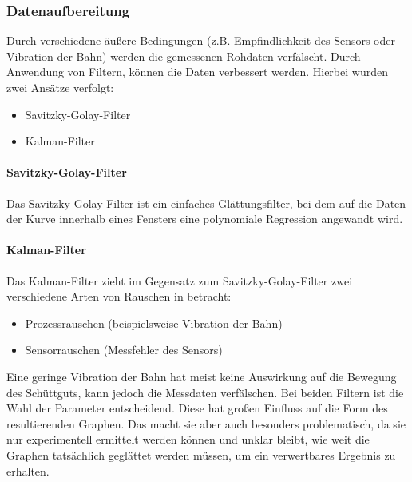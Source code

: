 \subsubsection{Datenaufbereitung}
Durch verschiedene äußere Bedingungen (z.B. Empfindlichkeit des Sensors oder Vibration der Bahn) werden die gemessenen Rohdaten verfälscht. Durch Anwendung von Filtern, können die Daten verbessert werden.
Hierbei wurden zwei Ansätze verfolgt:
\begin{itemize}
\item Savitzky-Golay-Filter
\item Kalman-Filter
\end{itemize}
\paragraph{Savitzky-Golay-Filter}
Das Savitzky-Golay-Filter ist ein einfaches Glättungsfilter, bei dem auf die Daten der Kurve innerhalb eines Fensters eine polynomiale Regression angewandt wird.
\paragraph{Kalman-Filter}
Das Kalman-Filter zieht im Gegensatz zum Savitzky-Golay-Filter zwei verschiedene Arten von Rauschen in betracht:
\begin{itemize}
\item Prozessrauschen (beispielsweise Vibration der Bahn)
\item Sensorrauschen (Messfehler des Sensors)
\end{itemize}
Eine geringe Vibration der Bahn hat meist keine Auswirkung auf die Bewegung des Schüttguts, kann jedoch die Messdaten verfälschen. 
Bei beiden Filtern ist die Wahl der Parameter entscheidend. Diese hat großen Einfluss auf die Form des resultierenden Graphen. Das macht sie aber auch besonders problematisch, da sie nur experimentell ermittelt werden können und unklar bleibt, wie weit die Graphen tatsächlich geglättet werden müssen, um ein verwertbares Ergebnis zu erhalten. 